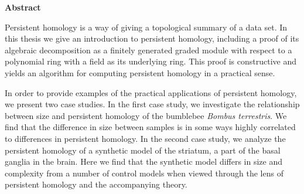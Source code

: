 \newenvironment{abstract}%
    {\cleardoublepage\thispagestyle{empty}\null\vfill\begin{center}%
    \bfseries Abstract \end{center}}%
    {\vfill\null}
        \begin{abstract}
          Persistent homology is a way of giving a topological summary of a data set. In this thesis we give an introduction to persistent homology, including a proof of its algebraic decomposition as a finitely generated graded module with respect to a polynomial ring with a field as its underlying ring. This proof is constructive and yields an algorithm for computing persistent homology in a practical sense.

          In order to provide examples of the practical applications of persistent homology, we present two case studies. In the first case study, we investigate the relationship between size and persistent homology of the bumblebee \textit{Bombus terrestris}. We find that the difference in size between samples is in some ways highly correlated to differences in persistent homology. In the second case study, we analyze the persistent homology of a synthetic model of the striatum, a part of the basal ganglia in the brain. Here we find that the synthetic model differs in size and complexity from a number of control models when viewed through the lens of persistent homology and the accompanying theory. \end{abstract}

